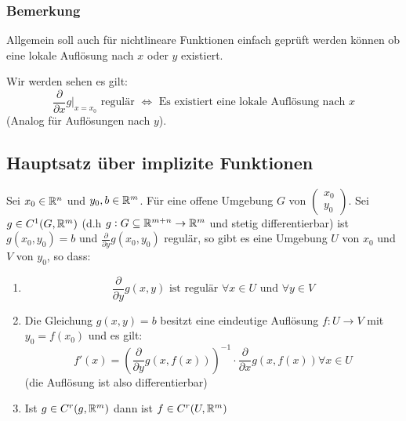 \subsubsection{Bemerkung}
Allgemein soll auch für nichtlineare Funktionen einfach geprüft werden können ob
eine lokale Auflösung nach $x$ oder $y$ existiert.

Wir werden sehen es gilt:
\begin{equation}
    \frac{\partial}{\partial x} g \vert_{x=x_0} \text{ regulär } \Leftrightarrow
    \text{ Es existiert eine lokale Auflösung nach }x
\end{equation}
(Analog für Auflösungen nach $y$).

\subsection{Hauptsatz über implizite Funktionen}
Sei $x_0 \in \mathbb{R}^n$ und $y_0, b \in \mathbb{R}^m$. Für eine offene Umgebung $G$ von
$\left(\begin{smallmatrix}x_0\\y_0\end{smallmatrix}\right)$. Sei $g \in C^1(G, \mathbb{R}^m)$
(d.h $g: G \subseteq \mathbb{R}^{m + n} \rightarrow \mathbb{R}^m$ und stetig differentierbar) ist
$g(x_0, y_0)=b$ und $\frac{\partial}{\partial y} g(x_0, y_0)$ regulär, so gibt
es eine Umgebung $U$ von $x_0$ und $V$ von $y_0$, so dass:
\begin{enumerate}[label= (\alph*)]
    \item
        \begin{equation*}
            \frac{\partial}{\partial y} g(x, y) \text{ ist regulär }
            \forall x \in U \text{ und } \forall y \in V
        \end{equation*}
    \item Die Gleichung $g(x,y)=b$ besitzt eine eindeutige Auflösung
        $f: U \rightarrow V$ mit $y_0 = f(x_0)$ und es gilt:
        \begin{equation*}
            f'(x) = {(\frac{\partial}{\partial y} g(x, f(x)) )}^{-1} \cdot
            \frac{\partial}{\partial x} g(x, f(x)) \forall x \in U
        \end{equation*}
        (die Auflösung ist also differentierbar)
    \item Ist $g \in C^r (g, \mathbb{R}^m)$ dann ist $f \in C^r(U, \mathbb{R}^m)$
\end{enumerate}
